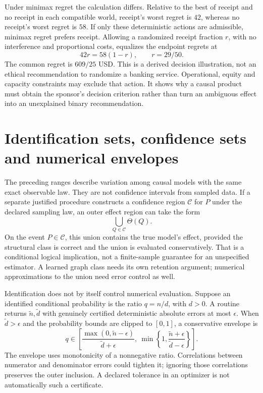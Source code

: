 Under minimax regret the calculation differs. Relative
to the best of receipt and no receipt in each compatible
world, receipt's worst regret is $42$, whereas no receipt's
worst regret is $58$. If only these deterministic actions
are admissible, minimax regret prefers receipt. Allowing a
randomized receipt fraction $r$, with no interference and
proportional costs, equalizes the endpoint regrets at
\[
 42r=58(1-r),\qquad r=29/50.
\]
The common regret is $609/25$ USD. This is a derived
decision illustration, not an ethical recommendation to
randomize a banking service. Operational, equity and
capacity constraints may exclude that action. It shows
why a causal product must obtain the sponsor's decision
criterion rather than turn an ambiguous effect into an
unexplained binary recommendation.~\citep{exec17_s3_decision}

\section{Identification sets, confidence sets and numerical envelopes}
\label{exec17:s3-numerical}

The preceding ranges describe variation among causal models
with the same exact observable law. They are not confidence
intervals from sampled data. If a separate justified
procedure constructs a confidence region $\mathcal C$
for $P$ under the declared sampling law, an outer effect
region can take the form
\[
 \bigcup_{Q\in\mathcal C}\Theta(Q).
\]
On the event $P\in\mathcal C$, this union contains the true
model's effect, provided the structural class is correct
and the union is evaluated conservatively. That is a
conditional logical implication, not a finite-sample
guarantee for an unspecified estimator. A learned graph
class needs its own retention argument; numerical
approximations to the union need error control as well.

Identification does not by itself control numerical
evaluation. Suppose an identified conditional probability
is the ratio $q=n/d$, with $d>0$. A routine returns
$\widetilde n,\widetilde d$ with genuinely certified
deterministic absolute errors at most $\epsilon$. When
$\widetilde d>\epsilon$ and the probability bounds are
clipped to $[0,1]$, a conservative envelope is
\[
 q\in\left[
 \frac{\max(0,\widetilde n-\epsilon)}{\widetilde d+\epsilon},
 \ \min\left\{1,
 \frac{\widetilde n+\epsilon}{\widetilde d-\epsilon}\right\}
 \right].
\]
The envelope uses monotonicity of a nonnegative ratio.
Correlations between numerator and denominator errors
could tighten it; ignoring those correlations preserves
the outer inclusion. A declared tolerance in an optimizer
is not automatically such a certificate.

